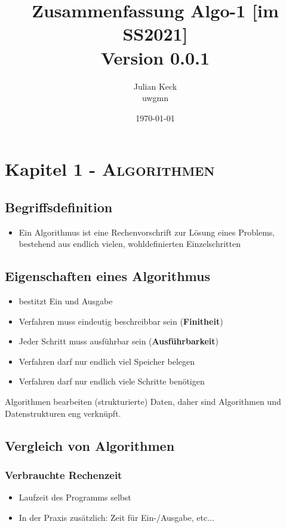 \documentclass{article}
\newcommand{\version}{0.0.1}
\newcommand{\subtitlerelsize}{1} %
\newcommand{\subtitlelinesep}{0.1em} %
\newcommand{\kapitel}[2]{Kapitel #1 - \textsc{#2}}
\newcommand{\strongColor}[1]{\textcolor{strongColor}{#1}}
\newcommand{\strong}[1]{\textbf{\strongColor{#1}}}
\newcommand{\important}[1]{\textcolor{importantColor}{#1}}
\begin{document}
\title{Zusammenfassung Algo-1 [im SS2021]\\[\subtitlelinesep]%
    \smaller[\subtitlerelsize]{}Version \version}
\author{Julian Keck\\uwgmn}
\date{\today}
\maketitle

\tableofcontents

\newpage

\section{\kapitel{1}{Algorithmen}}
\subsection{Begriffsdefinition}
\begin{itemize}
    \item Ein Algorithmus ist eine \important{Rechenvorschrift zur Lösung eines Problems, bestehend aus endlich vielen, wohldefinierten Einzelschritten}
\end{itemize}
\subsection{Eigenschaften eines Algorithmus}
\begin{itemize}
    \item bestitzt Ein und Ausgabe
    \item Verfahren muss eindeutig beschreibbar sein (\strong{Finitheit})
    \item Jeder Schritt muss \important{ausführbar} sein (\strong{Ausführbarkeit})
    \item Verfahren darf nur endlich viel Speicher belegen
    \item Verfahren darf nur endlich viele Schritte benötigen
\end{itemize}
Algorithmen bearbeiten (strukturierte) Daten, daher sind Algorithmen und Datenstrukturen eng verknüpft.

\subsection{Vergleich von Algorithmen}
\subsubsection{Verbrauchte Rechenzeit}
\begin{itemize}
    \item Laufzeit des Programms selbst
    \item In der Praxis zusätzlich: Zeit für Ein-/Ausgabe, etc...
\end{itemize}
\end{document}
